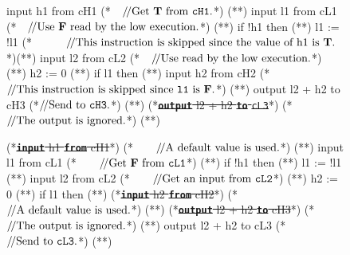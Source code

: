 \documentclass[10pt,a4paper,oneside]{article}
\def\VTRUE{\ensuremath{\textbf{T}}}
\def\VFALSE{\ensuremath{\textbf{F}}}
\def\Prog{\ensuremath{\pi}}
\def\Progl#1{\ensuremath{\Prog[#1]}}
\def\ctab{}
\def\icomment#1{\ensuremath{\ctab/\!/\textnormal{#1}}}
\def\linecode#1{{\texttt{#1}}}
\def\linecodeb#1{{\texttt{\bfseries #1}}}
\begin{document}
\begin{figure}[!t]
\begin{lrbox}{\mylistingbox}\begin{minipage}{\columnwidth}\begin{javascript}
input h1 from cH1 (*~~\icomment{Get \VTRUE\ from \linecode{cH1}.}*) (*\label{example:DI:HEx:l1}*)
input l1 from cL1 (*~~\icomment{Use \VFALSE\ read by the low execution.}*) (*\label{example:DI:HEx:l2}*)
if !h1 then       (*\label{example:DI:HEx:l3}*)
    l1 := !l1     (*~~~~~~\icomment{This instruction is skipped since the value of h1 is \VTRUE.}*)(*\label{example:DI:HEx:l4}*)
input l2 from cL2 (*~~\icomment{Use  read by the low execution.}*) (*\label{example:DI:HEx:l5}*)
h2 := 0           (*\label{example:DI:HEx:l6}*)
if l1 then        (*\label{example:DI:HEx:l7}*)
    input h2 from cH2 (*\icomment{This instruction is skipped since \linecode{l1} is \VFALSE.}*)   (*\label{example:DI:HEx:l8}*)
output l2 + h2 to cH3 (*\icomment{Send  to \linecode{cH3}.}*)  (*\label{example:DI:HEx:l9}*)
(*\sout{\linecodeb{output} l2 + h2 \linecodeb{to} \linecode{cL3}}*)  (*\icomment{The output is ignored.}*) (*\label{example:DI:HEx:l10}*)
\end{javascript}\end{minipage}\end{lrbox} \subfloat[The high execution \Progl{0}]{\label{fig:example:DI:execution:H}\usebox{\mylistingbox}}\begin{lrbox}{\mylistingbox}\begin{minipage}{\columnwidth}\begin{javascript}
(*\sout{\linecodeb{input} h1 \linecodeb{from} cH1}*) (*~~~~\icomment{A default value is used.}*) (*\label{example:DI:LEx:l1}*)
input l1 from cL1 (*~~~~\icomment{Get \VFALSE\ from \linecode{cL1}}*) (*\label{example:DI:LEx:l2}*)
if !h1 then (*\label{example:DI:LEx:l3}*)
    l1 := !l1 (*\label{example:DI:LEx:l4}*)
input l2 from cL2 (*~~~~\icomment{Get an input from \linecode{cL2}}*) (*\label{example:DI:LEx:l5}*)
h2 := 0 (*\label{example:DI:LEx:l6}*)
if l1 then  (*\label{example:DI:LEx:l7}*)
    (*\sout{\linecodeb{input} h2 \linecodeb{from} cH2}*) (*\icomment{A default value is used.}*) (*\label{example:DI:LEx:l8}*)
(*\sout{\linecodeb{output} l2 + h2 \linecodeb{to} cH3}*) (*\icomment{The output is ignored.}*) (*\label{example:DI:LEx:l9}*)
output l2 + h2 to cL3 (*\icomment{Send  to \linecode{cL3}.}*)  (*\label{example:DI:LEx:l10}*)
\end{javascript}\end{minipage}\end{lrbox} \\

\end{figure}
\end{document}
